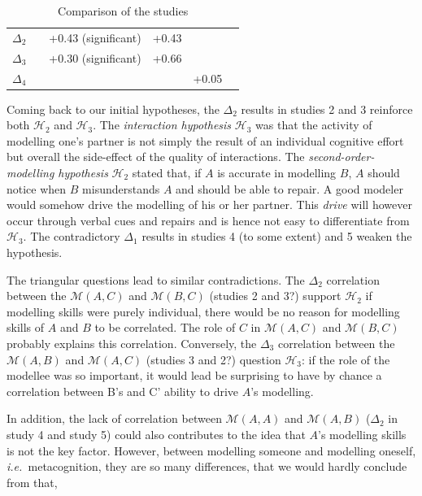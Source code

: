 \documentclass[natbib]{svjour3}
\newcommand{\ie}{{\textit{i.e.\ }}}
\newcommand{\gmodel}[2]{{$\mathcal{M}(#1, #2)$}}
\begin{document}
\begin{table}[h!t]
{\begin{tabular}{p{3cm}|p{4cm}|p{4cm}|p{4cm}|p{4cm}|p{4cm}}
\textit{$\Delta_2$}           &                                  & +0.43 (significant)             & +0.43                     &                           &                              \\
    \textit{$\Delta_3$}       &                                  & +0.30 (significant)             & +0.66                     &                           &                              \\
\textit{$\Delta_4$}           &                                  &                                 &                           & +0.05                     &                             
\end{tabular}
}
\caption{Comparison of the studies}
\label{synthesis_table}
\end{table}

Coming back to our initial hypotheses, the $\Delta_2$ results in studies 2 and 3
reinforce both $\mathcal{H}_{2}$ and $\mathcal{H}_{3}$. The \emph{interaction
hypothesis} $\mathcal{H}_{3}$ was that the activity of modelling one's partner
is not simply the result of an individual cognitive effort but overall the
side-effect of the quality of interactions. The \emph{second-order-modelling
hypothesis} $\mathcal{H}_{2}$ stated that, if $A$ is accurate in modelling $B$,
$A$ should notice when $B$ misunderstands $A$ and should be able to repair. A
good modeler would somehow drive the modelling of his or her partner.  This
\emph{drive} will however occur through verbal cues and repairs and is hence not
easy to differentiate from $\mathcal{H}_{3}$.  The contradictory $\Delta_1$
results in studies 4 (to some extent) and 5 weaken the hypothesis. 

The triangular questions lead to similar contradictions. The $\Delta_2$
correlation between the \gmodel{A}{C} and \gmodel{B}{C} (studies 2 and 3?)
support $\mathcal{H}_{2}$ if modelling skills were purely individual, there would
be no reason for modelling skills of $A$ and $B$ to be correlated.  The role of $C$ in
\gmodel{A}{C} and \gmodel{B}{C} probably explains this correlation.  Conversely,
the $\Delta_3$ correlation between the \gmodel{A}{B} and \gmodel{A}{C} (studies
3 and 2?) question $\mathcal{H}_{3}$: if the role of the modellee was so
important, it would lead be surprising to have by chance a correlation between
B's and C' ability to drive $A$'s modelling.

In addition, the lack of correlation between \gmodel{A}{A} and \gmodel{A}{B}
($\Delta_2$ in study 4 and study 5) could also contributes to the idea that $A$'s
modelling skills is not the key factor. However, between modelling someone and
modelling oneself, \ie  metacognition, they are so many differences, that we
would hardly conclude from that,
\end{document}
